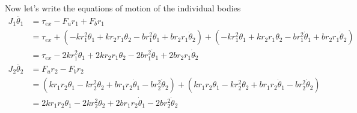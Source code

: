 \documentclass[twoside]{article}
\theoremstyle{definition}
\begin{document}
Now let's write the equations of motion of the individual bodies
%
\begin{align*}
  J_1 \ddot{\theta_1} &= \tau_{ex} - F_u r_1 + F_b r_1
  \\
  &= \tau_{ex} + \left(  -k r_1^2 \theta_1 + k r_2 r_1 \theta_2 - b
    r_1^2 \dot{\theta}_1 + b r_2 r_1
      \dot{\theta}_2 \right) + \left( -k r_1^2 \theta_1 + k r_2 r_1
    \theta_2 - b r_1^2 \dot{\theta}_1 + b r_2 r_1
      \dot{\theta}_2 \right)
\\
&= \tau_{ex} - 2 k r_1^2 \theta_1 +2 k r_2 r_1 \theta_2 - 2 b
    r_1^2 \dot{\theta}_1 + 2 b r_2 r_1 \dot{\theta}_2 
\\
 J_2 \ddot{\theta_2} &= F_u r_2 - F_b r_2
\\
  &= \left( k r_1 r_2 \theta_1 - k r_2^2 \theta_2 + b r_1 r_2 \dot{\theta}_1 - b r_2^2
      \dot{\theta}_2 \right) + \left( k r_1 r_2 \theta_1 - k r_2^2 \theta_2 + b r_1 r_2 \dot{\theta}_1 - b r_2^2
      \dot{\theta}_2 \right) 
\\
&= 2 k r_1 r_2 \theta_1 - 2 k r_2^2 \theta_2 + 2 b r_1 r_2
  \dot{\theta}_1 - 2 b r_2^2 \dot{\theta}_2
\end{align*}
\end{document}
